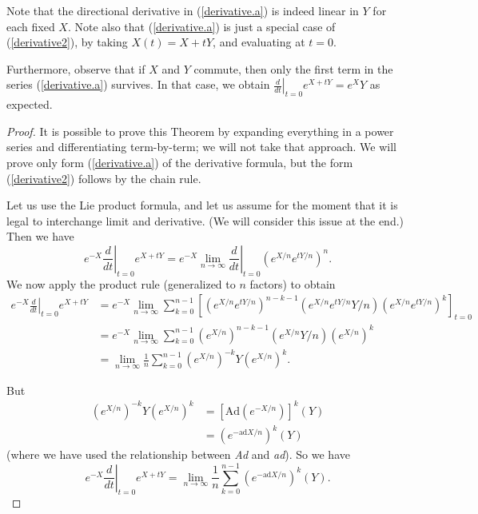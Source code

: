 \documentclass{amsbook}
\theoremstyle{plain}
\numberwithin{equation}{chapter}
\numberwithin{theorem}{chapter}
\begin{document}
Note that the directional derivative in (\ref{derivative.a}) is indeed linear
in $Y$ for each fixed $X$. Note also that (\ref{derivative.a}) is just a
special case of (\ref{derivative2}), by taking $X(t)=X+tY$, and evaluating at
$t=0$.

Furthermore, observe that if $X$ and $Y$ commute, then only the first term in
the series (\ref{derivative.a}) survives. In that case, we obtain $\left.
\frac d{dt}\right|  _{t=0}e^{X+tY}=e^{X}Y$ as expected.

\begin{proof}
It is possible to prove this Theorem by expanding everything in a power series
and differentiating term-by-term; we will not take that approach. We will
prove only form (\ref{derivative.a}) of the derivative formula, but the form
(\ref{derivative2}) follows by the chain rule.

Let us use the Lie product formula, and let us assume for the moment that it
is legal to interchange limit and derivative. (We will consider this issue at
the end.) Then we have
\[
e^{-X}\left.  \frac{d}{dt}\right|  _{t=0}e^{X+tY}=e^{-X}\lim_{n\rightarrow
\infty}\left.  \frac{d}{dt}\right|  _{t=0}\left(  e^{X/n}e^{tY/n}\right)
^{n}\text{.}%
\]
We now apply the product rule (generalized to $n$ factors) to obtain
\begin{align*}
e^{-X}\left.  \frac{d}{dt}\right|  _{t=0}e^{X+tY}  & =e^{-X}\lim
_{n\rightarrow\infty}\sum_{k=0}^{n-1}\left[  \left(  e^{X/n}e^{tY/n}\right)
^{n-k-1}\left(  e^{X/n}e^{tY/n}Y/n\right)  \left(  e^{X/n}e^{tY/n}\right)
^{k}\right]  _{t=0}\\
& =e^{-X}\lim_{n\rightarrow\infty}\sum_{k=0}^{n-1}\left(  e^{X/n}\right)
^{n-k-1}\left(  e^{X/n}Y/n\right)  \left(  e^{X/n}\right)  ^{k}\\
& =\lim_{n\rightarrow\infty}\frac{1}{n}\sum_{k=0}^{n-1}\left(  e^{X/n}\right)
^{-k}Y\left(  e^{X/n}\right)  ^{k}\text{.}%
\end{align*}

But
\begin{align*}
\left(  e^{X/n}\right)  ^{-k}Y\left(  e^{X/n}\right)  ^{k}  & =\left[
\mathrm{Ad}\left(  e^{-X/n}\right)  \right]  ^{k}\left(  Y\right)  \\
& =\left(  e^{-\mathrm{ad}X/n}\right)  ^{k}(Y)
\end{align*}
(where we have used the relationship between \textit{Ad} and \textit{ad}). So
we have
\begin{equation}
e^{-X}\left.  \frac{d}{dt}\right|  _{t=0}e^{X+tY}=\lim_{n\rightarrow\infty
}\frac{1}{n}\sum_{k=0}^{n-1}\left(  e^{-\mathrm{ad}X/n}\right)  ^{k}%
(Y)\text{.}\label{derivative.series}%
\end{equation}


\end{proof}
\end{document}
